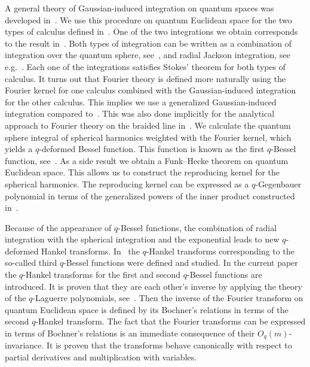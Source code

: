 \documentclass[pdftex]{sigma}
\numberwithin{equation}{section}
\begin{document}
A general theory of Gaussian-induced integration on quantum spaces was developed in~\cite{MR1303081}. We use this procedure on quantum Euclidean space for the two types of calculus def\/ined in~\cite{MR1138053}. One of the two integrations we obtain corresponds to the result in~\cite{MR1239953, MR1408120}. Both types of integration can be written as a combination of integration over the quantum sphere, see~\cite{MR1408120}, and radial Jackson integration, see e.g.~\cite[Section~1.11]{MR1052153}. Each one of the integrations satisf\/ies Stokes' theorem for both types of calculus. It turns out that Fourier theory is def\/ined more naturally using the Fourier kernel for one calculus combined with the Gaussian-induced integration for the other calculus. This implies we use a generalized Gaussian-induced integration compared to~\cite{MR1303081}. This was also done implicitly for the analytical approach to Fourier theory on the braided line in~\cite{MR1448685}. We calculate the quantum sphere integral of spherical harmonics weighted with the Fourier kernel, which yields a $q$-deformed Bessel function. This function is known as the f\/irst $q$-Bessel function, see~\cite{MR0649849}. As a side result we obtain a Funk--Hecke theorem on quantum Euclidean space. This allows us to construct the reproducing kernel for the spherical harmonics. The reproducing kernel can be expressed as a $q$-Gegenbauer polynomial in terms of the generalized powers of the inner product constructed in~\cite{MR1317458}.

Because of the appearance of $q$-Bessel functions, the combination of radial integration with the spherical integration and the exponential leads to new $q$-deformed Hankel transforms. In~\cite{MR1069750} the $q$-Hankel transforms corresponding to the so-called third $q$-Bessel functions were def\/ined and studied. In the current paper the $q$-Hankel transforms for the f\/irst and second $q$-Bessel functions are introduced. It is proven that they are each other's inverse by applying the theory of the $q$-Laguerre polynomials, see~\cite{MR0618759}. Then the inverse of the Fourier transform on quantum Euclidean space is def\/ined by its Bochner's relations in terms of the second $q$-Hankel transform. The fact that the Fourier transforms can be expressed in terms of Bochner's relations is an immediate consequence of their $O_q(m)$-invariance. It is proven that the transforms behave canonically with respect to partial derivatives and multiplication with variables.
\end{document}
